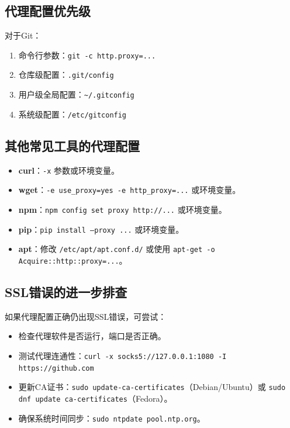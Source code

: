 \documentclass[12pt,a4paper]{article}
\begin{document}
\subsection{代理配置优先级}
对于Git：
\begin{enumerate}
    \item 命令行参数：\texttt{git -c http.proxy=...}
    \item 仓库级配置：\texttt{.git/config}
    \item 用户级全局配置：\texttt{\~{}/.gitconfig}
    \item 系统级配置：\texttt{/etc/gitconfig}
\end{enumerate}

\subsection{其他常见工具的代理配置}
\begin{itemize}
    \item \textbf{curl}：\texttt{-x} 参数或环境变量。
    \item \textbf{wget}：\texttt{-e use\_proxy=yes -e http\_proxy=...} 或环境变量。
    \item \textbf{npm}：\texttt{npm config set proxy http://...} 或环境变量。
    \item \textbf{pip}：\texttt{pip install --proxy ...} 或环境变量。
    \item \textbf{apt}：修改 \texttt{/etc/apt/apt.conf.d/} 或使用 \texttt{apt-get -o Acquire::http::proxy=...}。
\end{itemize}

\subsection{SSL错误的进一步排查}
如果代理配置正确仍出现SSL错误，可尝试：
\begin{itemize}
    \item 检查代理软件是否运行，端口是否正确。
    \item 测试代理连通性：\texttt{curl -x socks5://127.0.0.1:1080 -I https://github.com}
    \item 更新CA证书：\texttt{sudo update-ca-certificates}（Debian/Ubuntu）或 \texttt{sudo dnf update ca-certificates}（Fedora）。
    \item 确保系统时间同步：\texttt{sudo ntpdate pool.ntp.org}。
\end{itemize}
\end{document}

